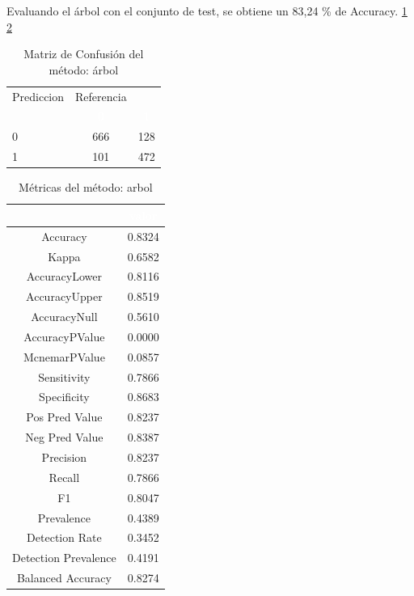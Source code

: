 Evaluando el árbol con el conjunto de test, se obtiene un 83,24 \% de Accuracy. \ref{tab:MatrizConf_arbol} \ref{tab:metricas_arbol}

\begin{table}[!h]
	
	\caption{\label{tab:MatrizConf_arbol}Matriz de Confusión del método: árbol }
	\centering
	\begin{tabular}[t]{lcc}
		\toprule
		\multicolumn{1}{c}{Prediccion} & \multicolumn{1}{c}{Referencia} & \multicolumn{1}{c}{ } \\
		\cmidrule(l{3pt}r{3pt}){1-1} \cmidrule(l{3pt}r{3pt}){2-2}
		\rowcolor{black}  \multicolumn{1}{c}{\textcolor{white}{\textbf{ }}} & \multicolumn{1}{c}{\textcolor{white}{\textbf{0}}} & \multicolumn{1}{c}{\textcolor{white}{\textbf{1}}}\\
		\midrule
		\rowcolor{gray!6}  0 & 666 & 128\\
		1 & 101 & 472\\
		\bottomrule
	\end{tabular}
\end{table}

\begin{table}[!h]
	
	\caption{\label{tab:metricas_arbol}Métricas del método: arbol }
	\centering
	\begin{tabular}[t]{cc}
		\toprule
		\rowcolor{black}  \multicolumn{1}{c}{\textcolor{white}{\textbf{metricas}}} & \multicolumn{1}{c}{\textcolor{white}{\textbf{valor}}}\\
		\midrule
		\rowcolor{gray!6}  Accuracy & 0.8324\\
		Kappa & 0.6582\\
		\rowcolor{gray!6}  AccuracyLower & 0.8116\\
		AccuracyUpper & 0.8519\\
		\rowcolor{gray!6}  AccuracyNull & 0.5610\\
		\addlinespace
		AccuracyPValue & 0.0000\\
		\rowcolor{gray!6}  McnemarPValue & 0.0857\\
		Sensitivity & 0.7866\\
		\rowcolor{gray!6}  Specificity & 0.8683\\
		Pos Pred Value & 0.8237\\
		\addlinespace
		\rowcolor{gray!6}  Neg Pred Value & 0.8387\\
		Precision & 0.8237\\
		\rowcolor{gray!6}  Recall & 0.7866\\
		F1 & 0.8047\\
		\rowcolor{gray!6}  Prevalence & 0.4389\\
		\addlinespace
		Detection Rate & 0.3452\\
		\rowcolor{gray!6}  Detection Prevalence & 0.4191\\
		Balanced Accuracy & 0.8274\\
		\bottomrule
	\end{tabular}
\end{table}


